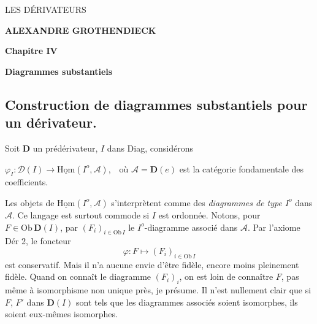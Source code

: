 \documentclass[11pt]{article}
\newcommand{\printedpage}[1]{\marginpar{\footnotesize p.~#1}}
\newcommand{\msp}[1]{\marginpar{\footnotesize [#1]}}
\newcommand{\D}{\mathbf{D}}
\newcommand{\cA}{\mathcal{A}}
\newcommand{\uHom}{\underline{\mathrm{Hom}}}
\begin{document}
\printedpage{}%

\begin{center}
{\LARGE\textsf{LES DÉRIVATEURS}}

\bigskip

\textbf{ALEXANDRE GROTHENDIECK}

\bigskip\bigskip

\textbf{Chapitre IV}

\medskip

\textbf{Diagrammes substantiels}
\end{center}

\clearpage


\printedpage{1}

\noindent

\msp{page 73}

\subsection*{Construction de diagrammes substantiels pour un dérivateur.}

\noindent Soit $\D$ un prédérivateur, $I$ dans Diag, considérons

\noindent $\varphi_I : \mathcal{D}(I) \longrightarrow \uHom(I^o,\cA)$,\ \ où $\cA=\D(e)$ est la catégorie fondamentale des coefficients. %

Les objets de $\uHom(I^o,\cA)$ s'interprètent comme des \textit{diagrammes de type $I^o$} dans $\cA$. Ce langage est surtout commode si $I$ est ordonnée. Notons, pour $F\in\mathrm{Ob}\,\D(I)$, par $(F_i)_{i\in\mathrm{Ob}\,I}$ le $I^o$-diagramme associé dans $\cA$. Par l'axiome Dér 2, le foncteur
\[
\varphi : F \longmapsto (F_i)_{i\in\mathrm{Ob}\,I}
\]
est conservatif. Mais il n'a aucune envie d'être fidèle, encore moins pleinement fidèle. Quand on connaît le diagramme $(F_i)_i$, on est loin de connaître $F$, pas même à isomorphisme non unique près, je présume. Il n'est nullement clair que si $F$, $F'$ dans $\D(I)$ sont tels que les diagrammes associés soient isomorphes, ils soient eux-mêmes isomorphes.
\end{document}
